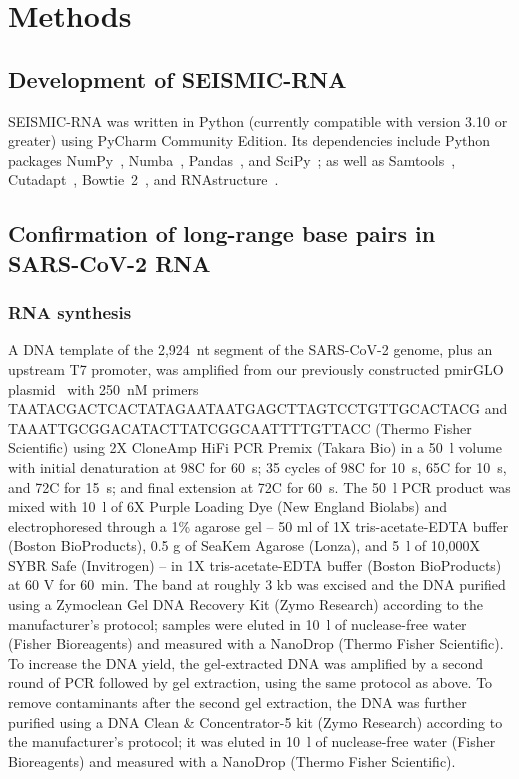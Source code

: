\documentclass[main.tex]{subfiles}
\begin{document}
\section{Methods}
\label{methods}


\subsection{Development of SEISMIC-RNA}

SEISMIC-RNA was written in Python (currently compatible with version 3.10 or greater) using PyCharm Community Edition.
Its dependencies include Python packages NumPy~\cite{Harris2020}, Numba~\cite{Lam2015}, Pandas~\cite{McKinney2010,Reback2020}, and SciPy~\cite{Virtanen2020}; as well as Samtools~\cite{Li2009}, Cutadapt~\cite{Martin2011}, Bowtie~2~\cite{Langmead2012}, and RNAstructure~\cite{Reuter2010}.


\subsection{Confirmation of long-range base pairs in SARS-CoV-2 RNA}

\subsubsection{RNA synthesis}

A DNA template of the 2,924~nt segment of the SARS-CoV-2 genome, plus an upstream T7 promoter, was amplified from our previously constructed pmirGLO plasmid~\cite{Lan2022} with 250~nM primers TAATACGACTCACTATAGAATAATGAGCTTAGTCCTGTTGCACTACG and TAAATTGCGGACATACTTATCGGCAATTTTGTTACC (Thermo Fisher Scientific) using 2X CloneAmp HiFi PCR Premix (Takara Bio) in a 50~\textmu l volume with initial denaturation at 98\textdegree C for 60~s; 35 cycles of 98\textdegree C for 10~s, 65\textdegree C for 10~s, and 72\textdegree C for 15~s; and final extension at 72\textdegree C for 60~s.
The 50~\textmu l PCR product was mixed with 10~\textmu l of 6X Purple Loading Dye (New England Biolabs) and electrophoresed through a 1\% agarose gel -- 50 ml of 1X tris-acetate-EDTA buffer (Boston BioProducts), 0.5 g of SeaKem Agarose (Lonza), and 5~\textmu l of 10,000X SYBR Safe (Invitrogen) -- in 1X tris-acetate-EDTA buffer (Boston BioProducts) at 60 V for 60~min.
The band at roughly 3 kb was excised and the DNA purified using a Zymoclean Gel DNA Recovery Kit (Zymo Research) according to the manufacturer's protocol; samples were eluted in 10~\textmu l of nuclease-free water (Fisher Bioreagents) and measured with a NanoDrop (Thermo Fisher Scientific).
To increase the DNA yield, the gel-extracted DNA was amplified by a second round of PCR followed by gel extraction, using the same protocol as above.
To remove contaminants after the second gel extraction, the DNA was further purified using a DNA Clean \& Concentrator-5 kit (Zymo Research) according to the manufacturer's protocol; it was eluted in 10~\textmu l of nuclease-free water (Fisher Bioreagents) and measured with a NanoDrop (Thermo Fisher Scientific).
\end{document}
